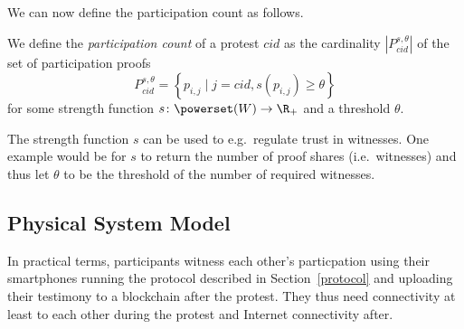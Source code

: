 We can now define the participation count as follows.
\begin{definition}
  We define the \emph{participation count} of a protest \(cid\) as the 
  cardinality \(|P_{cid}^{s,\theta}|\) of the set of participation proofs \[
    P_{cid}^{s,\theta} = \left\{ p_{i,j} \mid
      j = cid, s(p_{i,j})\geq \theta \right\}
  \] for some strength function \(s\colon \powerset(W)\to \R_+\) and a threshold 
  \(\theta\).
\end{definition}
The strength function \(s\) can be used to e.g.\ regulate trust in witnesses.
One example would be for \(s\) to return the number of proof shares (i.e.\ 
witnesses) and thus let \(\theta\) to be the threshold of the number of required 
witnesses.

\subsection{Physical System Model}
In practical terms, participants witness each other's particpation
using their smartphones running the protocol described in
Section~\ref{protocol} and uploading their testimony to a blockchain
after the protest. They thus need connectivity at least to each other
during the protest and Internet connectivity after. 


